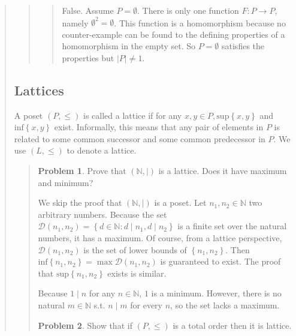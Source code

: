 \documentclass[a4paper, 12pt]{article}
\theoremstyle{definition}
\newtheorem{problem}{Problem}
\theoremstyle{definition}
\theoremstyle{definition}
\begin{document}
\begin{quote}
\begin{quote}
\begin{quote}
    False. Assume $P = \emptyset$. There is only one function $F : P \to P$,
    namely $\emptyset^2 = \emptyset$. This function is a homomorphism because no
    counter-example can be found to the defining properties of a homomorphism in
    the empty set. So $P = \emptyset$ satisfies the properties but $|P| \neq 1$.
\end{quote}

\end{quote}
\normalsize


\subsection{Lattices}

A poset $(P, \leq) $ is called a lattice if for any $x, y \in P,
\text{sup}\left\{ x, y \right\} $ and $\text{inf}\left\{ x, y \right\} $ exist.
Informally, this means that any pair of elements in $P$ is related to some
common successor and some common predecessor in $P$. We use $(L, \leq)$ to
denote a lattice.


\small
\begin{quote}

\begin{problem}
    Prove that $(\mathbb{N}, \mid)$ is a lattice. Does it have maximum and
    minimum?
\end{problem}

We skip the proof that $(\mathbb{N}, \mid)$ is a poset. Let $n_1, n_2 \in \mathbb{N}$ two arbitrary numbers. Because the set
$\mathcal{D}(n_1, n_2) = \left\{ d \in \mathbb{N} : d \mid n_1, d \mid n_2
\right\} $ is a finite set over the natural numbers, it has a maximum. Of
course, from a lattice perspective, $\mathcal{D}(n_1, n_2)$ is the set of lower
bounds of $\left\{n_1, n_2 \right\} $. Then $\text{inf}\left\{ n_1, n_2 \right\}
=\max \mathcal{D}(n_1, n_2)$ is guaranteed to exist. The proof that
$\text{sup}\left\{ n_1, n_2 \right\} $ exists is similar.

Because $1 \mid n$ for any $n \in \mathbb{N}$, $1$ is a minimum. However, there
is no natural $m \in \mathbb{N}$ s.t. $n \mid m$ for every $n$, so the set lacks
a maximum.

\begin{problem}
    Show that if $(P, \leq)$ is a total order then it is lattice.
\end{problem}


\end{quote}
\end{quote}
\end{document}
